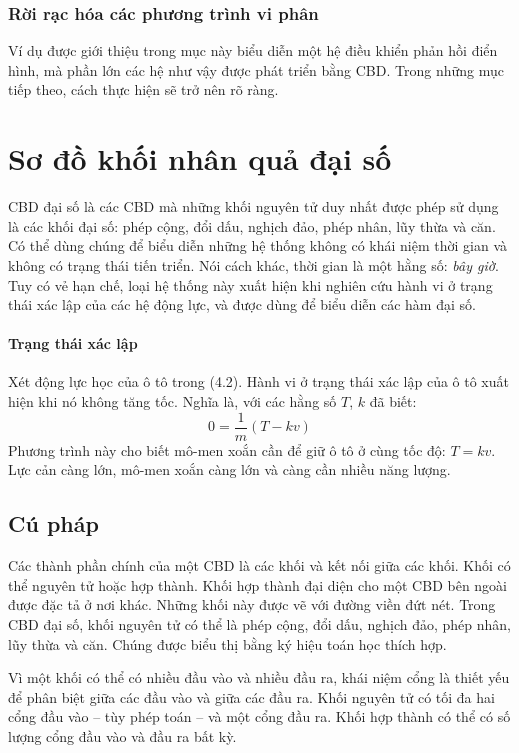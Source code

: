 \subsubsection{Rời rạc hóa các phương trình vi phân}
Ví dụ được giới thiệu trong mục này biểu diễn một hệ điều khiển phản hồi điển hình, mà phần lớn các hệ như vậy được phát triển bằng CBD. Trong những mục tiếp theo, cách thực hiện sẽ trở nên rõ ràng.

\section{Sơ đồ khối nhân quả đại số}
CBD đại số là các CBD mà những khối nguyên tử duy nhất được phép sử dụng là các khối đại số: phép cộng, đổi dấu, nghịch đảo, phép nhân, lũy thừa và căn. Có thể dùng chúng để biểu diễn những hệ thống không có khái niệm thời gian và không có trạng thái tiến triển. Nói cách khác, thời gian là một hằng số: \emph{bây giờ}.
Tuy có vẻ hạn chế, loại hệ thống này xuất hiện khi nghiên cứu hành vi ở trạng thái xác lập của các hệ động lực, và được dùng để biểu diễn các hàm đại số.

\paragraph{Trạng thái xác lập}
Xét động lực học của ô tô trong (4.2). Hành vi ở trạng thái xác lập của ô tô xuất hiện khi nó không tăng tốc. Nghĩa là, với các hằng số $T$, $k$ đã biết:
\[0=\frac{1}{m}(T-kv)\]
Phương trình này cho biết mô-men xoắn cần để giữ ô tô ở cùng tốc độ: $T=kv$. Lực cản càng lớn, mô-men xoắn càng lớn và càng cần nhiều năng lượng.

\subsection{Cú pháp}
Các thành phần chính của một CBD là các khối và kết nối giữa các khối. Khối có thể nguyên tử hoặc hợp thành. Khối hợp thành đại diện cho một CBD bên ngoài được đặc tả ở nơi khác. Những khối này được vẽ với đường viền đứt nét. Trong CBD đại số, khối nguyên tử có thể là phép cộng, đổi dấu, nghịch đảo, phép nhân, lũy thừa và căn. Chúng được biểu thị bằng ký hiệu toán học thích hợp.

Vì một khối có thể có nhiều đầu vào và nhiều đầu ra, khái niệm cổng là thiết yếu để phân biệt giữa các đầu vào và giữa các đầu ra. Khối nguyên tử có tối đa hai cổng đầu vào -- tùy phép toán -- và một cổng đầu ra. Khối hợp thành có thể có số lượng cổng đầu vào và đầu ra bất kỳ.

